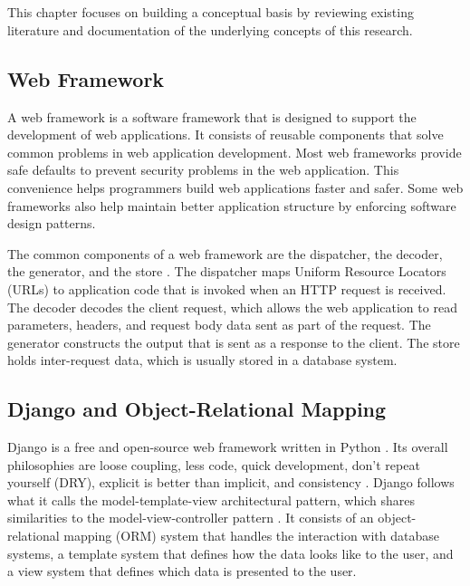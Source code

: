\chapter{\babDua}

This chapter focuses on building a conceptual basis by reviewing existing
literature and documentation of the underlying concepts of this research.

\section{Web Framework}

A web framework is a software framework that is designed to support the
development of web applications. It consists of reusable components that solve
common problems in web application development. Most web frameworks provide
safe defaults to prevent security problems in the web application. This
convenience helps programmers build web applications faster and safer. Some web
frameworks also help maintain better application structure by enforcing
software design patterns.

The common components of a web framework are the dispatcher, the decoder, the
generator, and the store \cite{schwarz_webframework}. The dispatcher maps
Uniform Resource Locators (URLs) to application code that is invoked when an
HTTP request is received. The decoder decodes the client request, which allows
the web application to read parameters, headers, and request body data sent as
part of the request. The generator constructs the output that is sent as a
response to the client. The store holds inter-request data, which is usually
stored in a database system.

\section{Django and Object-Relational Mapping}

Django is a free and open-source web framework written in Python \cite{django}.
Its overall philosophies are loose coupling, less code, quick development,
don't repeat yourself (DRY), explicit is better than implicit, and consistency
\cite{django:philosophies}. Django follows what it calls the
model-template-view architectural pattern, which shares similarities to the
model-view-controller pattern \cite{django:faq}. It consists of an
object-relational mapping (ORM) system that handles the interaction with
database systems, a template system that defines how the data looks like to the
user, and a view system that defines which data is presented to the user.

